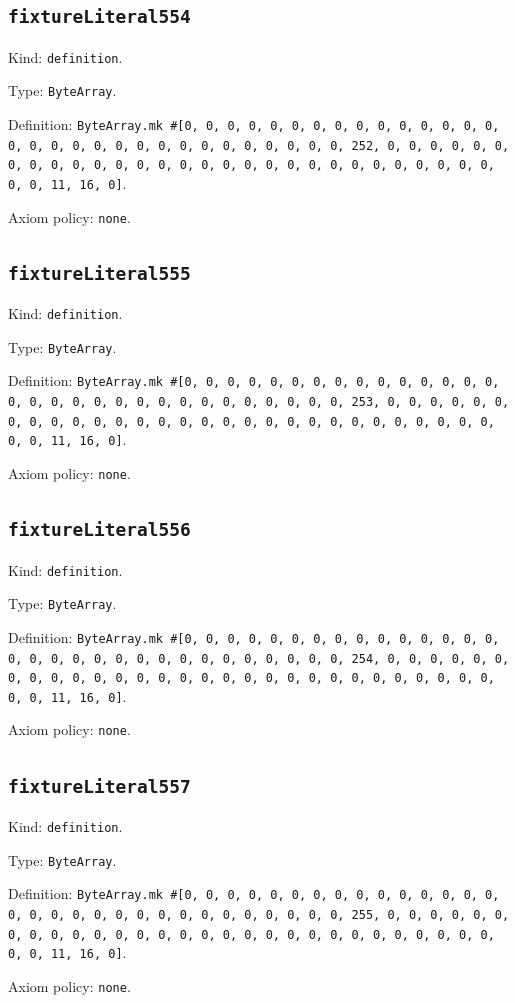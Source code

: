 \documentclass[11pt]{article}
\begin{document}
\subsection*{\texttt{fixtureLiteral554}}
\noindent Kind: \texttt{definition}.\par
\noindent Type: \texttt{ByteArray}.\par
\noindent Definition: \texttt{ByteArray.mk \#[0, 0, 0, 0, 0, 0, 0, 0, 0, 0, 0, 0, 0, 0, 0, 0, 0, 0, 0, 0, 0, 0, 0, 0, 0, 0, 0, 0, 0, 0, 0, 252, 0, 0, 0, 0, 0, 0, 0, 0, 0, 0, 0, 0, 0, 0, 0, 0, 0, 0, 0, 0, 0, 0, 0, 0, 0, 0, 0, 0, 0, 0, 0, 11, 16, 0]}.\par
\noindent Axiom policy: \texttt{none}.\par
\subsection*{\texttt{fixtureLiteral555}}
\noindent Kind: \texttt{definition}.\par
\noindent Type: \texttt{ByteArray}.\par
\noindent Definition: \texttt{ByteArray.mk \#[0, 0, 0, 0, 0, 0, 0, 0, 0, 0, 0, 0, 0, 0, 0, 0, 0, 0, 0, 0, 0, 0, 0, 0, 0, 0, 0, 0, 0, 0, 0, 253, 0, 0, 0, 0, 0, 0, 0, 0, 0, 0, 0, 0, 0, 0, 0, 0, 0, 0, 0, 0, 0, 0, 0, 0, 0, 0, 0, 0, 0, 0, 0, 11, 16, 0]}.\par
\noindent Axiom policy: \texttt{none}.\par
\subsection*{\texttt{fixtureLiteral556}}
\noindent Kind: \texttt{definition}.\par
\noindent Type: \texttt{ByteArray}.\par
\noindent Definition: \texttt{ByteArray.mk \#[0, 0, 0, 0, 0, 0, 0, 0, 0, 0, 0, 0, 0, 0, 0, 0, 0, 0, 0, 0, 0, 0, 0, 0, 0, 0, 0, 0, 0, 0, 0, 254, 0, 0, 0, 0, 0, 0, 0, 0, 0, 0, 0, 0, 0, 0, 0, 0, 0, 0, 0, 0, 0, 0, 0, 0, 0, 0, 0, 0, 0, 0, 0, 11, 16, 0]}.\par
\noindent Axiom policy: \texttt{none}.\par
\subsection*{\texttt{fixtureLiteral557}}
\noindent Kind: \texttt{definition}.\par
\noindent Type: \texttt{ByteArray}.\par
\noindent Definition: \texttt{ByteArray.mk \#[0, 0, 0, 0, 0, 0, 0, 0, 0, 0, 0, 0, 0, 0, 0, 0, 0, 0, 0, 0, 0, 0, 0, 0, 0, 0, 0, 0, 0, 0, 0, 255, 0, 0, 0, 0, 0, 0, 0, 0, 0, 0, 0, 0, 0, 0, 0, 0, 0, 0, 0, 0, 0, 0, 0, 0, 0, 0, 0, 0, 0, 0, 0, 11, 16, 0]}.\par
\noindent Axiom policy: \texttt{none}.\par
\end{document}
